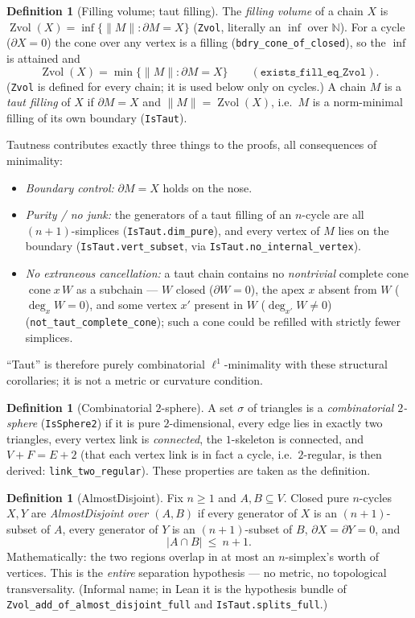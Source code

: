 \documentclass[11pt]{article}
\theoremstyle{plain}
\theoremstyle{definition}
\newtheorem{definition}[theorem]{Definition}
\theoremstyle{remark}
\newcommand{\Zvol}{\operatorname{Zvol}}
\newcommand{\bd}{\partial}
\newcommand{\code}[1]{\texttt{#1}}
\newcommand{\card}[1]{\lvert #1\rvert}
\newcommand{\norm}[1]{\lVert #1\rVert}
\begin{document}
\begin{definition}[Filling volume; taut filling]\label{def:taut}
The \emph{filling volume} of a chain $X$ is $\Zvol(X)=\inf\{\norm{M}:\bd M=X\}$ (\code{Zvol},
literally an $\inf$ over $\mathbb N$). For a cycle ($\bd X=0$) the cone over any vertex is a filling
(\code{bdry\_cone\_of\_closed}), so the $\inf$ is attained and
\[
\Zvol(X)=\min\{\norm{M}:\bd M=X\}\qquad(\code{exists\_fill\_eq\_Zvol}).
\]
(\code{Zvol} is defined for every chain; it is used below only on cycles.)
A chain $M$ is a \emph{taut filling} of $X$ if $\bd M=X$ and $\norm{M}=\Zvol(X)$, i.e.\ $M$
is a norm-minimal filling of its own boundary (\code{IsTaut}).
\end{definition}

Tautness contributes exactly three things to the proofs, all consequences of minimality:
\begin{itemize}
\item[(T1)] \emph{Boundary control:} $\bd M=X$ holds on the nose.
\item[(T2)] \emph{Purity / no junk:} the generators of a taut filling of an $n$-cycle are
all $(n{+}1)$-simplices (\code{IsTaut.dim\_pure}), and every vertex of $M$ lies on the
boundary (\code{IsTaut.vert\_subset}, via \code{IsTaut.no\_internal\_vertex}).
\item[(T3)] \emph{No extraneous cancellation:} a taut chain contains no \emph{nontrivial}
complete cone $\operatorname{cone} x\,W$ as a subchain --- $W$ closed ($\bd W=0$), the apex $x$
absent from $W$ ($\deg_x W=0$), and some vertex $x'$ present in $W$ ($\deg_{x'} W\neq 0$)
(\code{not\_taut\_complete\_cone}); such a cone could be
refilled with strictly fewer simplices.
\end{itemize}
``Taut'' is therefore purely combinatorial $\ell^1$-minimality with these structural
corollaries; it is not a metric or curvature condition.

\begin{definition}[Combinatorial $2$-sphere]\label{def:sphere}
A set $\sigma$ of triangles is a \emph{combinatorial $2$-sphere} (\code{IsSphere2}) if it is
pure $2$-dimensional, every edge lies in exactly two triangles, every vertex link is
\emph{connected}, the $1$-skeleton is connected, and $V+F=E+2$ (that each vertex link is in fact a
cycle, i.e.\ $2$-regular, is then derived: \code{link\_two\_regular}). These properties are taken
as the definition.
\end{definition}

\begin{definition}[AlmostDisjoint]\label{def:ad}
Fix $n\ge 1$ and $A,B\subseteq V$. Closed pure $n$-cycles $X,Y$ are
\emph{AlmostDisjoint over $(A,B)$} if every generator of $X$ is an $(n{+}1)$-subset of $A$,
every generator of $Y$ is an $(n{+}1)$-subset of $B$, $\bd X=\bd Y=0$, and
\[
\card{A\cap B}\ \le\ n+1 .
\]
Mathematically: the two regions overlap in at most an $n$-simplex's worth of vertices.
This is the \emph{entire} separation hypothesis --- no metric, no topological transversality.
(Informal name; in Lean it is the hypothesis bundle of
\code{Zvol\_add\_of\_almost\_disjoint\_full} and \code{IsTaut.splits\_full}.)
\end{definition}
\end{document}
